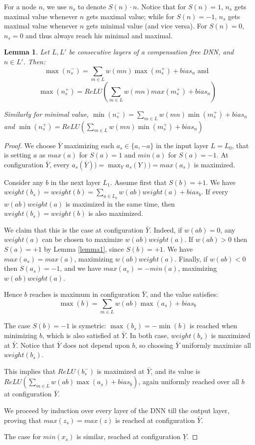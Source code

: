 \documentclass[]{article}
\newtheorem{lemma}{Lemma}
\theoremstyle{definition}
\begin{document}
For a node $n$, we use $n_s$ to denote $S(n)\cdot n$. 
Notice that for $S(n)=1$, $n_s$ gets maximal value whenever $n$ gets maximal value; 
while for $S(n)=-1$, $n_s$ gets maximal value whenever $n$ gets minimal value (and vice versa). For $S(n)=0$, $n_s=0$ and thus always reach his minimal and maximal.



\begin{lemma}
	\label{lemma2}
	Let $L,L'$ be consecutive layers of a compensation free DNN, and $n \in L'$. 
	Then:
		$$ \max(n^-_s)=\sum_{m \in L}w(m n) \max(m^+_s)+bias_n \text{ and }$$
		$$\max(n^+_s)=ReLU(\sum_{m \in L}w(m n) max(m^+_s)+bias_n)$$
		
	
	
	Similarly  for minimal value,	
	$ \min(n^-_s)=\sum_{m \in L}w(m n)\min(m^+_s)+bias_n $ and
	$ \min(n^+_s)=ReLU(\sum_{m \in L}w(m n)\min(m^+_s)+bias_n)$
\end{lemma}

\begin{proof}
We choose $\bar{Y}$ maximizing each $a_s \in \{a,-a\}$ in the input layer $L=L_0$,
	that is setting $a$ as $max(a)$ for $S(a)=1$ and $min(a)$ for $S(a)=-1$.
At configuration $\bar{Y}$, every $a_s(\bar{Y}))=\max_Y {a_s(Y))}=max(a_s)$ is maximized.  

Consider any $b$ in the next layer $L_1$.
Assume first that $S(b)=+1$.
We have $weight(b_s)= weight(b) = \sum_{a \in L_0} w(a b) weight(a) + bias_b$.
If every $w(a b) weight(a)$ is maximized in the same time, 
then $weight(b_s)= weight(b)$ is also maximized. 

We claim that this is the case at 
configuration $\bar{Y}$.
Indeed, if $w(a b)=0$, any $weight(a)$ can be chosen to maximize 
$w(a b) weight(a)$. If $w(a b)>0$ then $S(a) = +1$ by Lemma \ref{lemma1}, since
$S(b)=+1$. We have $max(a_s) = max(a)$, maximizing $w(a b) weight(a)$.
Finally, if $w(a b)<0$ then $S(a_s) = -1$, and we have 
$max(a_s) = -min(a)$, maximizing $w(a b) weight(a)$.

Hence $b$ reaches is maximum in configuration $\bar{Y}$, and the value satisfies: 
$$\max(b)=\sum_{m \in L}w(a b) \max(a_s)+bias_b$$

The case $S(b)=-1$ is symetric:
$\max(b_s)= -\min(b)$ is reached when minimizing $b$, which is also 
satisfied at $\bar{Y}$.
In both case, $weight(b_s)$ is maximized at $\bar{Y}$. Notice that $\bar{Y}$ does not depend upon $b$, so choosing $\bar{Y}$ uniformly maximize all $weight(b_s)$.

This implies that $ReLU(b^-_s)$ is maximized at $\bar{Y}$, and its value is 
$ReLU(\sum_{m \in L}w(a b) \max(a_s)+bias_b)$, again uniformly reached over all $b$ at configuration $\bar{Y}$.

We proceed by induction over every layer of the DNN till the output layer, proving that 
$max(z_s)=max(z)$ is reached at configuration $\bar{Y}$.

The case for $min(x_s)$ is similar, reached at configuration $\underline{Y}$.
\end{proof}
\end{document}
